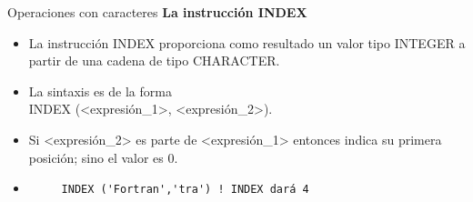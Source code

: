 \begin{frame}[fragile]{Operaciones con caracteres}
 \textbf{La instrucción INDEX}
  \begin{itemize}[<+(1)->]
   \item La instrucción INDEX proporciona como resultado un valor tipo INTEGER a partir de una cadena de tipo CHARACTER.
   \item La sintaxis es de la forma \\
    \centering INDEX (<expresión\_1>, <expresión\_2>).

   \item Si <expresión\_2> es parte de <expresión\_1> entonces indica su primera posición; sino el valor es 0.
   \item []
    \begin{verbatim}
     INDEX ('Fortran','tra') ! INDEX dará 4   
    \end{verbatim} 
  \end{itemize}
\end{frame}


